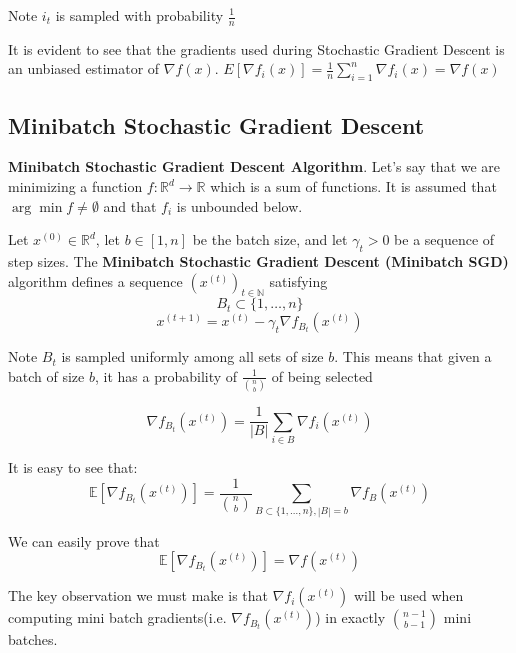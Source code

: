 \noindent Note $i_t$ is sampled with probability $\frac{1}{n}$

\noindent It is evident to see that the gradients used during Stochastic Gradient Descent is an unbiased estimator of $\nabla f(x)$. $E[\nabla f_i(x)] = \frac{1}{n} \sum_{i=1}^{n} \nabla f_i(x) = \nabla f(x)$

\subsection{Minibatch Stochastic Gradient Descent}
\noindent \textbf{Minibatch Stochastic Gradient Descent Algorithm}. Let's say that we are minimizing a function $f: \mathbb{R}^d \rightarrow \mathbb{R}$ which is a sum of functions. It is assumed that $\arg \min f \neq \emptyset$ and that $f_i$ is unbounded below.  

\noindent Let $x^{(0)} \in \mathbb{R}^d$, let $b \in [1, n]$ be the batch size, and let $\gamma_t > 0$ be a sequence of step sizes. The \textbf{Minibatch Stochastic Gradient Descent (Minibatch SGD)} algorithm defines a sequence $(x^{(t)})_{t \in \mathbb{N}}$ satisfying 
\begin{equation}
    B_t \subset \{1, \dots, n\}
\end{equation}
\begin{equation}
    x^{(t + 1)}  = x^{(t)} - \gamma_t \nabla f_{B_t}(x^{(t)})
\end{equation}

\noindent Note $B_t$ is sampled uniformly among all sets of size $b$. This means that given a batch of size $b$, it has a probability of $\frac{1}{\binom{n}{b}}$ of being selected 

\begin{equation}
    \nabla f_{B_t}(x^{(t)}) = \frac{1}{|B|} \sum_{i \in B} \nabla f_{i}(x^{(t)})
\end{equation}

It is easy to see that: 
\begin{equation}
    \mathbb{E}[\nabla f_{B_t}(x^{(t)})] = \frac{1}{\binom{n}{b}} \sum_{B \subset \{1, \dots, n\} , |B| = b} \nabla f_{B}(x^{(t)})
\end{equation}

We can easily prove that 
\begin{equation}
    \mathbb{E}[\nabla f_{B_t}(x^{(t)})] = \nabla f(x^{(t)})
\end{equation}

The key observation we must make is that $\nabla f_i(x^{(t)})$ will be used when computing mini batch gradients(i.e. $\nabla f_{B_t}(x^{(t)})$) in exactly $\binom{n - 1}{b - 1}$ mini batches. 

